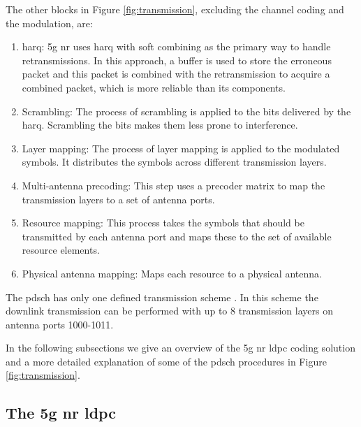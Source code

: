 The other blocks in Figure \ref{fig:transmission}, excluding the channel coding and the modulation, are:
\begin{enumerate}
	\item \Gls{harq}: \gls{5g} \gls{nr} uses \gls{harq} with soft combining as the primary way to handle retransmissions. In this approach, a buffer is used to store the erroneous packet and this packet is combined with the retransmission to acquire a combined packet, which is more reliable than its components.
	\item Scrambling: The process of scrambling is applied to the bits delivered by the \gls{harq}. Scrambling the bits makes them less prone to interference.
	\item Layer mapping: The process of layer mapping is applied to the modulated symbols. It distributes the symbols across different transmission layers.
	\item Multi-antenna precoding: This step uses a precoder matrix to map the transmission layers to a set of antenna ports.
	\item Resource mapping: This process takes the symbols that should be transmitted by each antenna port and maps these to the set of available resource elements.
	\item Physical antenna mapping: Maps each resource to a physical antenna.
\end{enumerate}

The \gls{pdsch} has only one defined transmission scheme \cite{3gpp.38.214}.
%
In this scheme the downlink transmission can be performed with up to 8 transmission layers on antenna ports 1000-1011.
%


In the following subsections we give an overview of the \gls{5g} \gls{nr} \gls{ldpc} coding solution and a more detailed explanation of some of the \gls{pdsch} procedures in Figure \ref{fig:transmission}.



\subsection{The \gls{5g} \gls{nr} \gls{ldpc}}


